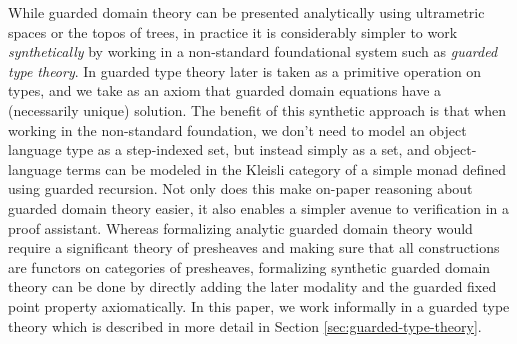 
While guarded domain theory can be presented analytically using
ultrametric spaces or the topos of trees, in practice it is
considerably simpler to work \emph{synthetically} by working in a
non-standard foundational system such as \emph{guarded type
theory}. In guarded type theory later is taken as a primitive
operation on types, and we take as an axiom that guarded domain
equations have a (necessarily unique) solution. The benefit of this
synthetic approach is that when working in the non-standard
foundation, we don't need to model an object language type as a
step-indexed set, but instead simply as a set, and object-language
terms can be modeled in the Kleisli category of a simple monad defined
using guarded recursion. Not only does this make on-paper reasoning
about guarded domain theory easier, it also enables a simpler avenue
to verification in a proof assistant. Whereas formalizing analytic
guarded domain theory would require a significant theory of presheaves
and making sure that all constructions are functors on categories of
presheaves, formalizing synthetic guarded domain theory can be done by
directly adding the later modality and the guarded fixed point
property axiomatically.
%
%
In this paper, we work informally in a guarded type theory which is described in
more detail in Section \ref{sec:guarded-type-theory}.

